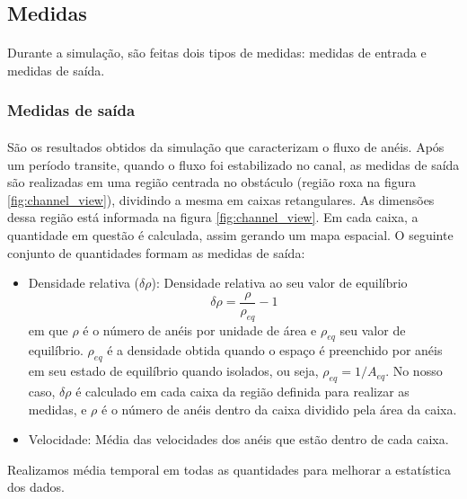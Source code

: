 \documentclass{article}
\theoremstyle{definition}
\begin{document}
\subsection{Medidas}
\paragraph{}
Durante a simulação, são feitas dois tipos de medidas: medidas de entrada e medidas de saída.

\subsubsection{Medidas de saída}
\paragraph{}
São os resultados obtidos da simulação que caracterizam o fluxo de anéis. Após um período transite, quando o fluxo foi estabilizado no canal, as medidas de saída são realizadas em uma região centrada no obstáculo (região roxa na figura \ref{fig:channel_view}), dividindo a mesma em caixas retangulares. As dimensões dessa região está informada na figura \ref{fig:channel_view}.  Em cada caixa, a quantidade em questão é calculada, assim gerando um mapa espacial. O seguinte conjunto de quantidades formam as medidas de saída:

\begin{itemize}
    \item Densidade relativa ($\delta \rho$): Densidade relativa ao seu valor de equilíbrio 
    \begin{equation}
    \delta \rho = \frac{\rho}{\rho_{eq}} - 1
    \label{eq:rel_den}
    \end{equation}
    em que $\rho$ é o número de anéis por unidade de área e $\rho_{eq}$ seu valor de equilíbrio. $\rho_{eq}$ é a densidade obtida quando o espaço é preenchido por anéis em seu estado de equilíbrio quando isolados, ou seja, $\rho_{eq} = 1 / A_{eq}$. No nosso caso, $\delta \rho$ é calculado em cada caixa da região definida para realizar as medidas, e $\rho$ é o número de anéis dentro da caixa dividido pela área da caixa.
    
    \item Velocidade: Média das velocidades dos anéis que estão dentro de cada caixa.
\end{itemize}

Realizamos média temporal em todas as quantidades para melhorar a estatística dos dados.
\end{document}
